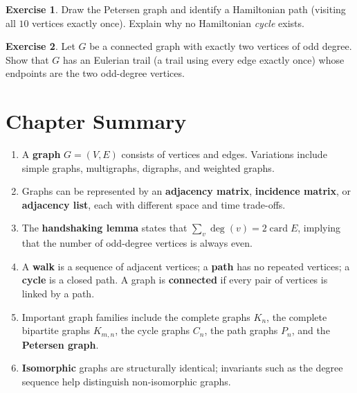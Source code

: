\documentclass[12pt,a4paper,openany]{book}
\theoremstyle{definition}
\newtheorem{exercise}{Exercise}[chapter]
\theoremstyle{plain}
\theoremstyle{remark}
\DeclareMathOperator{\card}{card}
\begin{document}
\begin{exercise}\label{exo:graph11}
Draw the Petersen graph and identify a Hamiltonian path (visiting all
$10$ vertices exactly once).  Explain why no Hamiltonian \emph{cycle}
exists.
\end{exercise}

\begin{exercise}\label{exo:graph12}
Let $G$ be a connected graph with exactly two vertices of odd degree.
Show that $G$ has an Eulerian trail (a trail using
every edge exactly once) whose endpoints are the two odd-degree vertices.
\end{exercise}

\section{Chapter Summary}\label{sec:graph-summary}

\begin{enumerate}
\item A \textbf{graph} $G = (V, E)$ consists of vertices and edges.
      Variations include simple graphs, multigraphs, digraphs, and
      weighted graphs.
\item Graphs can be represented by an \textbf{adjacency matrix},
      \textbf{incidence matrix}, or \textbf{adjacency list}, each with
      different space and time trade-offs.
\item The \textbf{handshaking lemma} states that
      $\sum_{v} \deg(v) = 2\card{E}$, implying that the number of
      odd-degree vertices is always even.
\item A \textbf{walk} is a sequence of adjacent vertices; a \textbf{path}
      has no repeated vertices; a \textbf{cycle} is a closed path.
      A graph is \textbf{connected} if every pair of vertices is linked
      by a path.
\item Important graph families include the complete graphs $K_n$, the
      complete bipartite graphs $K_{m,n}$, the cycle graphs $C_n$, the
      path graphs $P_n$, and the \textbf{Petersen graph}.
\item \textbf{Isomorphic} graphs are structurally identical; invariants
      such as the degree sequence help distinguish non-isomorphic graphs.
\end{enumerate}

\end{document}
